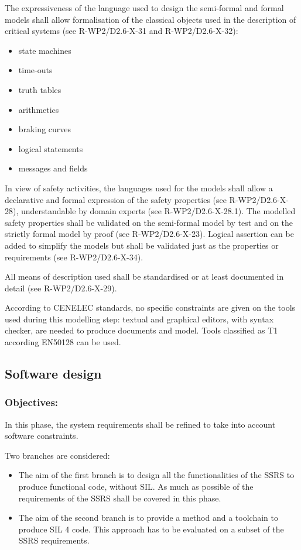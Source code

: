 The expressiveness of the language used to design the semi-formal and formal models shall allow formalisation of the classical objects used in the description of critical systems (see R-WP2/D2.6-X-31 and R-WP2/D2.6-X-32):

\begin{itemize}
\item state machines
\item time-outs
\item truth tables
\item arithmetics
\item braking curves
\item logical statements
\item messages and fields
\end{itemize}


In view of safety activities, the languages used for the models shall allow a declarative and formal expression of the safety properties (see R-WP2/D2.6-X-28), understandable by domain experts (see R-WP2/D2.6-X-28.1). The modelled safety properties shall be validated on the semi-formal model by test and on the strictly formal model by proof (see R-WP2/D2.6-X-23). Logical assertion can be added to simplify the models but shall be validated just as the properties or requirements (see R-WP2/D2.6-X-34).

All means of description used shall be standardised or at least documented in detail (see R-WP2/D2.6-X-29). 

According to  CENELEC standards, no specific constraints are given on the tools used during this modelling step: textual and graphical editors, with syntax checker, are needed to  produce documents and model. Tools classified as T1 according EN50128 can be used.



\subsection{Software design}
\label{sec:sw-design}

\subsubsection{Objectives:}
\label{sec:sw-req-objective}


In this phase, the system requirements shall be refined to take into account software constraints.

Two branches are considered:
\begin{itemize}
\item  The aim of the first branch  is to  design all the functionalities of the SSRS to  produce functional code, without SIL. As much as possible of the requirements of the SSRS shall be covered in this phase.
\item The aim  of the second branch is to provide a method and a toolchain to produce SIL 4 code. This approach has to be evaluated on a subset of the SSRS requirements.
\end{itemize}


